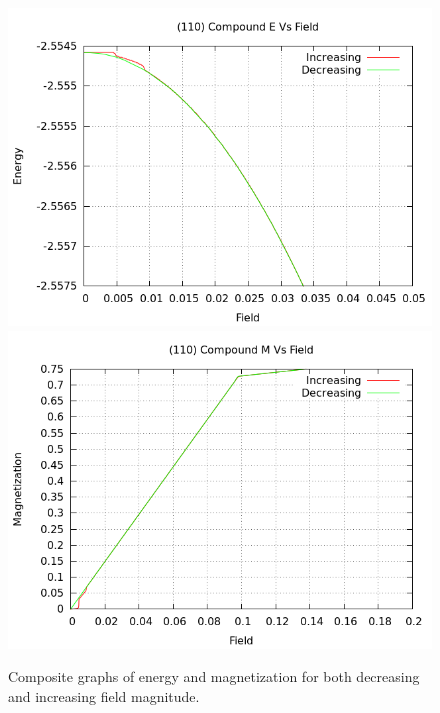 \documentclass{article}
\begin{document}
\begin{figure}[ht]
\centering
\includegraphics[scale=0.6]{HVariedData/compoundEM/110Ecompound.png}
\includegraphics[scale=0.6]{HVariedData/compoundEM/110Mcompound.png}
\caption{Composite graphs of energy and magnetization for both decreasing and increasing field magnitude.}
\end{figure}
\clearpage
\end{document}
